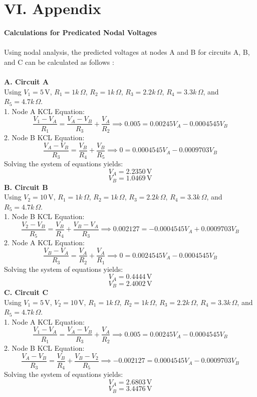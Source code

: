 \documentclass[12pt]{article}
\begin{document}
\section*{VI. Appendix}
\textbf{Calculations for Predicated Nodal Voltages}\\\\
Using nodal analysis, the predicted voltages at nodes A and B for circuits A, B, and C can be calculated as follows : \\\\
\textbf{A. Circuit A}\\
Using $V_1 = 5\,\text{V}$, $R_1 = 1k\,\Omega$, $R_2 = 1k\,\Omega$, $R_3 = 2.2k\,\Omega$, $R_4 = 3.3k\,\Omega$, and $R_5 = 4.7k\,\Omega$.\\
1. Node A KCL Equation:
\[\frac{V_1-V_A}{R_1} = \frac{V_A-V_B}{R_3} + \frac{V_A}{R_2} \implies 0.005 = 0.00245V_A -0.0004545V_B\]
2. Node B KCL Equation:
\[\frac{V_A-V_B}{R_3} = \frac{V_B}{R_4} + \frac{V_B}{R_5}\implies 0 = 0.0004545V_A -0.0009703V_B\]
Solving the system of equations yields:
\[V_A = 2.2350\,\text{V}\]
\[V_B = 1.0469\,\text{V}\]
\textbf{B. Circuit B}\\
Using $V_2 = 10\,\text{V}$, $R_1 = 1k\,\Omega$, $R_2 = 1k\,\Omega$, $R_3 = 2.2k\,\Omega$, $R_4 = 3.3k\,\Omega$, and $R_5 = 4.7k\,\Omega$.\\
1. Node B KCL Equation:
\[\frac{V_2 - V_B}{R_5} = \frac{V_B}{R_4} + \frac{V_B-V_A}{R_3}\implies 0.002127= -0.0004545V_A + 0.0009703V_B\]
2. Node A KCL Equation:
\[\frac{V_B-V_A}{R_3} = \frac{V_A}{R_2} + \frac{V_A}{R_1}\implies 0 = 0.0024545V_A -0.0004545V_B\]
Solving the system of equations yields:
\[V_A = 0.4444\,\text{V}\]
\[V_B = 2.4002\,\text{V}\]
\textbf{C. Circuit C}\\
Using $V_1 = 5\,\text{V}$, $V_2 = 10\,\text{V}$, $R_1 = 1k\,\Omega$, $R_2 = 1k\,\Omega$, $R_3 = 2.2k\,\Omega$, $R_4 = 3.3k\,\Omega$, and $R_5 = 4.7k\,\Omega$.\\
1. Node A KCL Equation:
\[\frac{V_1 - V_A}{R_1} = \frac{V_A - V_B}{R_3} + \frac{V_A}{R_2}\implies 0.005 = 0.00245V_A -0.0004545V_B\]
2. Node B KCL Equation:
\[\frac{V_A - V_B}{R_3} = \frac{V_B}{R_4} + \frac{V_B-V_2}{R_5}\implies -0.002127= 0.0004545V_A - 0.0009703V_B\]
Solving the system of equations yields:
\[V_A = 2.6803\,\text{V}\]
\[V_B = 3.4476\,\text{V}\]
\end{document}
